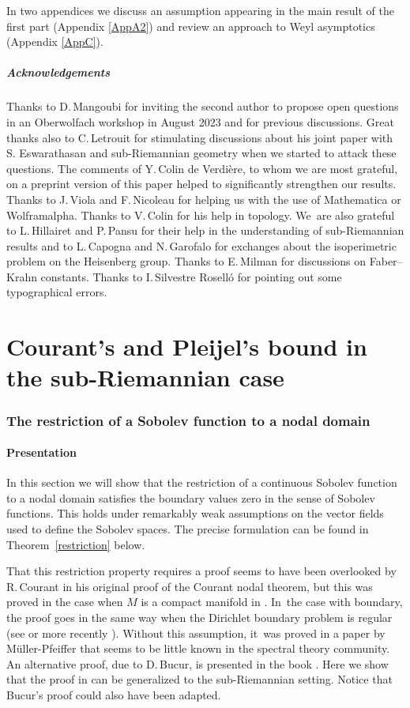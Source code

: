 \documentclass[JEP,XML,SOM,Unicode,published]{cedram}
\theoremstyle{definition}
\newcommand{\1}{\mathbbm{1}}
\begin{document}
In two appendices we discuss an assumption appearing in the main result of the first part (Appendix \ref{AppA2}) and review an approach to Weyl asymptotics (Appendix \ref{AppC}).

\subsubsection*{Acknowledgements}
Thanks to D.\,Mangoubi for inviting the second author to propose open questions in an Oberwolfach workshop in August 2023 and for previous discussions. Great thanks also to C.\,Letrouit for stimulating discussions about his joint paper with S. Eswarathasan and sub-Riemannian geometry when we started to attack these questions. The comments of Y.\,Colin de Verdière, to whom we are most grateful, on a preprint version \cite{FrHe1} of this paper helped to significantly strengthen our results. Thanks to J.\,Viola and F.\,Nicoleau for helping us with the use of Mathematica or Wolframalpha. Thanks to V.\,Colin for his help in topology. We~are also grateful to L.\,Hillairet and P.\,Pansu for their help in the understanding of sub-Riemannian results and to L.\,Capogna and N.\,Garofalo for exchanges about the isoperimetric problem on the Heisenberg group. Thanks to E.\,Milman for discussions on Faber--Krahn constants. Thanks to I.\,Silvestre Roselló for pointing out some typographical errors.

\part{Courant's and Pleijel's bound in the sub-Riemannian case}

\section{The restriction of a Sobolev function to a nodal domain}\label{srest}

\subsection{Presentation}
In this section we will show that the restriction of a continuous Sobolev function to a nodal domain satisfies the boundary values zero in the sense of Sobolev functions. This holds under remarkably weak assumptions on the vector fields used to define the Sobolev spaces. The precise formulation can be found in Theorem~\ref{restriction} below.

That this restriction property requires a proof seems to have been overlooked by R.\,Courant in his original proof of the Courant nodal theorem, but this was proved in the case when $M$ is a compact manifold in \cite{BerMe}. In~the case with boundary, the proof goes in the same way when the Dirichlet boundary problem is regular (see \cite{An} or more recently \cite{LMP}). Without this assumption, it~was proved in a paper by Müller-Pfeiffer \cite{MP} that seems to be little known in the spectral theory community. An alternative proof, due to D.\,Bucur, is presented in the book \cite{LMP}. Here we show that the proof in \cite{MP} can be generalized to the sub-Riemannian setting. Notice that Bucur's proof could also have been adapted.
\end{document}
